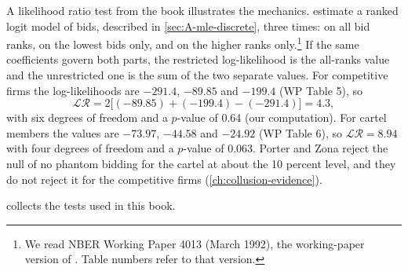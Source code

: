 A likelihood ratio test from the book illustrates the mechanics. \citet{PorterZona1993} estimate a ranked logit model of
bids, described in \cref{sec:A-mle-discrete}, three times: on all bid ranks, on the lowest bids only, and on the higher
ranks only.\footnote{We read NBER Working Paper 4013 (March 1992), the working-paper version of \citet{PorterZona1993}.
Table numbers refer to that version.} If the same coefficients govern both parts, the restricted log-likelihood is the
all-ranks value and the unrestricted one is the sum of the two separate values. For competitive firms the log-likelihoods
are $-291.4$, $-89.85$ and $-199.4$ (WP Table 5), so
\begin{equation*}
  \mathcal{LR} = 2\big[(-89.85) + (-199.4) - (-291.4)\big] = 4.3,
\end{equation*}
with six degrees of freedom and a $p$-value of 0.64 (our computation). For cartel members the values are $-73.97$,
$-44.58$ and $-24.92$ (WP Table 6), so $\mathcal{LR} = 8.94$ with four degrees of freedom and a $p$-value of 0.063. Porter and
Zona reject the null of no phantom bidding for the cartel at about the 10 percent level, and they do not reject it for
the competitive firms (\cref{ch:collusion-evidence}).

 collects the tests used in this book.

